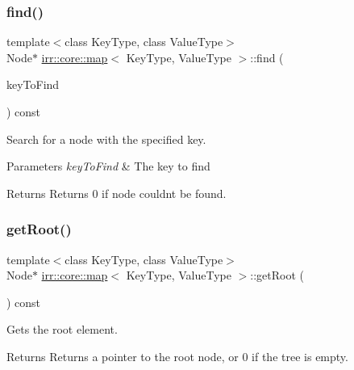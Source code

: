 \subsubsection{\texorpdfstring{find()}{find()}\hspace{0.1cm}{\footnotesize\ttfamily [2/2]}}
{\footnotesize\ttfamily template$<$class Key\+Type, class Value\+Type$>$ \\
Node$\ast$ \hyperlink{classirr_1_1core_1_1map}{irr\+::core\+::map}$<$ Key\+Type, Value\+Type $>$\+::find (\begin{DoxyParamCaption}\item[{const Key\+Type \&}]{key\+To\+Find }\end{DoxyParamCaption}) const\hspace{0.3cm}{\ttfamily [inline]}}



Search for a node with the specified key. 


\begin{DoxyParams}{Parameters}
{\em key\+To\+Find} & The key to find \\
\hline
\end{DoxyParams}
\begin{DoxyReturn}{Returns}
Returns 0 if node couldn\textquotesingle{}t be found. 
\end{DoxyReturn}
\mbox{\label{classirr_1_1core_1_1map_a6666acf9724e2e20cd338a6a5ff66c65}} 
\subsubsection{\texorpdfstring{get\+Root()}{getRoot()}\hspace{0.1cm}{\footnotesize\ttfamily [1/2]}}
{\footnotesize\ttfamily template$<$class Key\+Type, class Value\+Type$>$ \\
Node$\ast$ \hyperlink{classirr_1_1core_1_1map}{irr\+::core\+::map}$<$ Key\+Type, Value\+Type $>$\+::get\+Root (\begin{DoxyParamCaption}{ }\end{DoxyParamCaption}) const\hspace{0.3cm}{\ttfamily [inline]}}



Gets the root element. 

\begin{DoxyReturn}{Returns}
Returns a pointer to the root node, or 0 if the tree is empty. 
\end{DoxyReturn}
\mbox{\label{classirr_1_1core_1_1map_a6666acf9724e2e20cd338a6a5ff66c65}} 
